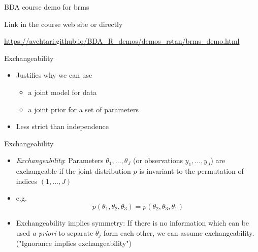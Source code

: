 \documentclass[finnish,english,t]{beamer}
\begin{document}
\begin{frame}[fragile]{BDA course demo for brms}

Link in the course web site or directly

\small
\url{https://avehtari.github.io/BDA_R_demos/demos_rstan/brms_demo.html}
  
\end{frame}


\begin{frame}{Exchangeability}

  \begin{itemize}
  \item Justifies why we can use
    \begin{itemize}
    \item a joint model for data
    \item a joint prior for a set of parameters
    \end{itemize}
  \item Less strict than independence
  \end{itemize}
\end{frame}

\begin{frame}{Exchangeability}

  \begin{itemize}
  \item \textit{Exchangeability}: Parameters
    $\theta_1,\ldots,\theta_J$ (or observations $y_1,\ldots,y_J$) are
    exchangeable if the joint distribution $p$ is invariant to the
    permutation of indices $(1,\ldots,J)$
  \item e.g.
    \begin{equation*}
      p(\theta_1,\theta_2,\theta_3) = p(\theta_2,\theta_3,\theta_1)
    \end{equation*}

  \item Exchangeability implies symmetry: If there is no information
    which can be used \textit{a priori} to separate $\theta_j$ form
    each other, we can assume exchangeability. ("Ignorance implies
    exchangeability")

  \end{itemize}
\end{frame}
\end{document}
